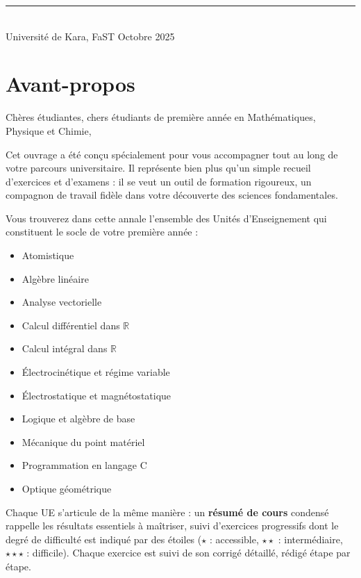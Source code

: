 \documentclass[12pt,a4paper]{article}
\begin{document}
\begin{titlepage}
\vspace{0.5cm}
\rule{\textwidth}{0.4pt}\\[0.15cm]
{\small Université de Kara, FaST \hfill Octobre 2025}

\end{titlepage}

\newpage
\thispagestyle{plain}
\pagestyle{fancy}

\section*{Avant-propos}

Chères étudiantes, chers étudiants de première année en Mathématiques, Physique et Chimie,

Cet ouvrage a été conçu spécialement pour vous accompagner tout au long de votre parcours universitaire. Il représente bien plus qu'un simple recueil d'exercices et d'examens : il se veut un outil de formation rigoureux, un compagnon de travail fidèle dans votre découverte des sciences fondamentales.

Vous trouverez dans cette annale l'ensemble des Unités d'Enseignement qui constituent le socle de votre première année :

\begin{itemize}
  \item Atomistique
  \item Algèbre linéaire
  \item Analyse vectorielle
  \item Calcul différentiel dans $\mathbb{R}$
  \item Calcul intégral dans $\mathbb{R}$
  \item Électrocinétique et régime variable
  \item Électrostatique et magnétostatique
  \item Logique et algèbre de base
  \item Mécanique du point matériel
  \item Programmation en langage C
  \item Optique géométrique
\end{itemize}

Chaque UE s'articule de la même manière : un \textbf{résumé de cours} condensé rappelle les résultats essentiels à maîtriser, suivi d'exercices progressifs dont le degré de difficulté est indiqué par des étoiles ($\star$ : accessible, $\star\star$ : intermédiaire, $\star\star\star$ : difficile). Chaque exercice est suivi de son corrigé détaillé, rédigé étape par étape.
\end{document}
